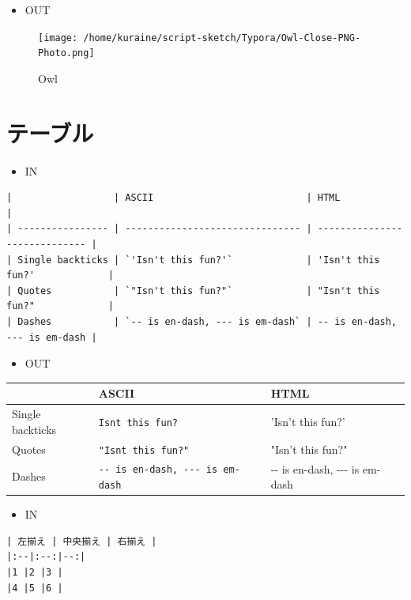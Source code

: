 \documentclass[]{article}
\begin{document}
\begin{itemize}
\item
  OUT
\end{itemize}

\begin{figure}
\centering
\texttt{[image: /home/kuraine/script-sketch/Typora/Owl-Close-PNG-Photo.png]}
\caption{Owl}
\end{figure}

\section{テーブル}\label{header-n353}

\begin{itemize}
\item
  IN
\end{itemize}

\begin{verbatim}
|                  | ASCII                           | HTML                          |
| ---------------- | ------------------------------- | ----------------------------- |
| Single backticks | `'Isn't this fun?'`             | 'Isn't this fun?'             |
| Quotes           | `"Isn't this fun?"`             | "Isn't this fun?"             |
| Dashes           | `-- is en-dash, --- is em-dash` | -- is en-dash, --- is em-dash |
\end{verbatim}

\begin{itemize}
\item
  OUT
\end{itemize}

\begin{longtable}[]{@{}lll@{}}
\toprule
& ASCII & HTML\tabularnewline
\midrule
\endhead
Single backticks &
\texttt{\textquotesingle{}Isn\textquotesingle{}t\ this\ fun?\textquotesingle{}}
& 'Isn't this fun?'\tabularnewline
Quotes & \texttt{"Isn\textquotesingle{}t\ this\ fun?"} & "Isn't this
fun?"\tabularnewline
Dashes & \texttt{-\/-\ is\ en-dash,\ -\/-\/-\ is\ em-dash} & -\/- is
en-dash, -\/-\/- is em-dash\tabularnewline
\bottomrule
\end{longtable}

\begin{itemize}
\item
  IN
\end{itemize}

\begin{verbatim}
| 左揃え | 中央揃え | 右揃え |
|:--|:--:|--:|
|1 |2 |3 |
|4 |5 |6 |
\end{verbatim}
\end{document}
